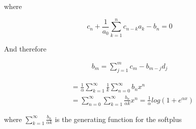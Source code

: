 where

\begin{equation}
	c_n + \frac{1}{a_0}\sum\limits_{k=1}^n c_{n-k}a_k - b_n = 0
\end{equation}

And therefore

\begin{align*}
	b_{m} = \sum\limits_{j=1}^{m}c_{m}-b_{m-j}d_{j}
\end{align*}

\begin{align*}
	& = \frac{1}{\alpha}\sum\limits_{k=1}^{\infty}\frac{1}{k}\sum\limits_{n=0}^{\infty}b_{n}x^{n} \\
	& = \sum\limits_{n=0}^{\infty}\sum\limits_{k=1}^{\infty}\frac{b_{n}}{\alpha k}x^{n}=\frac{1}{\alpha}log(1+e^{\alpha x})
\end{align*}

where $\sum\limits_{k=1}^{\infty}\frac{b_{n}}{\alpha k}$ is the generating function for the softplus

%
%
%

